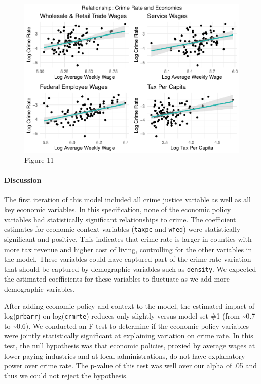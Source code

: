 \documentclass[]{article}
\let\oldparagraph\paragraph
\renewcommand{\paragraph}[1]{\oldparagraph{#1}\mbox{}}
\begin{document}
\begin{figure}

{\centering \includegraphics{lab_3_v7_files/figure-latex/unnamed-chunk-34-1} 

}

\caption{Figure 11}\label{fig:unnamed-chunk-34}
\end{figure}

\hypertarget{discussion-1}{%
\paragraph{Discussion}\label{discussion-1}}

The first iteration of this model included all crime justice variable as
well as all key economic variables. In this specification, none of the
economic policy variables had statistically significant relationships to
crime. The coefficient estimates for economic context variables
(\texttt{taxpc} and \texttt{wfed}) were statistically significant and
positive. This indicates that crime rate is larger in counties with more
tax revenue and higher cost of living, controlling for the other
variables in the model. These variables could have captured part of the
crime rate variation that should be captured by demographic variables
such as \texttt{density}. We expected the estimated coefficients for
these variables to fluctuate as we add more demographic variables.

After adding economic policy and context to the model, the estimated
impact of log(\texttt{prbarr}) on log(\texttt{crmrte}) reduces only
slightly versus model set \#1 (from \textasciitilde{}0.7 to
\textasciitilde{}0.6). We conducted an F-test to determine if the
economic policy variables were jointly statistically significant at
explaining variation on crime rate. In this test, the null hypothesis
was that economic policies, proxied by average wages at lower paying
industries and at local administrations, do not have explanatory power
over crime rate. The p-value of this test was well over our alpha of .05
and thus we could not reject the hypothesis.
\end{document}
